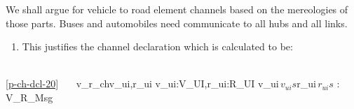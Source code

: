 \noindent
\begynd
\pind We shall argue for vehicle to road element channels
      based on the mereologies of those parts. 
\begynd
\pind Buses and automobiles need communicate to
\begynd
\pind all hubs and
\pind all links.
\afslut
\afslut
\afslut
\begin{enumerate}\setei
\item \label{p-ch-dcl-20} This justifies the channel declaration
                        which is calculated to be:
\savei\end{enumerate}\footsize\HHHH\LLLL                  
\bp
{}\\
\ref{p-ch-dcl-20}\ \ \ {\LBRACE} v\_r\_ch{\LBRACKET}v\_ui,r\_ui{\RBRACKET} {\BAR} v\_ui:V\_UI,r\_ui:R\_UI {\RDOT} v\_ui{\ISIN}\,$v_{ui}s${\WEDGE}r\_ui{\ISIN}\,$r_{ui}s$ {\RBRACE}: V\_R\_Msg 
\ep
\normalsize\rm\HHHH
\label{p-mono.Channels.n}


